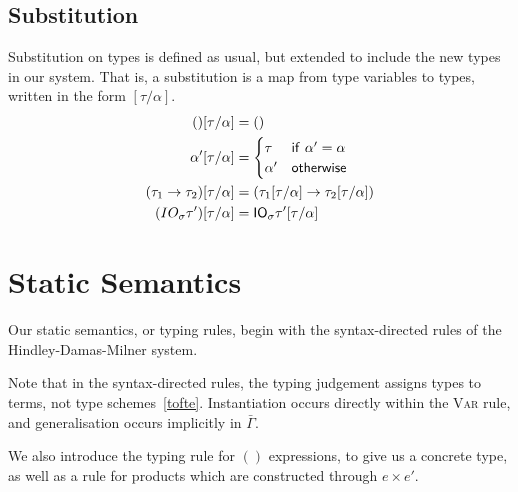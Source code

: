 \subsection{Substitution}
Substitution on types is defined as usual, but extended to include the
new types in our system. That is, a substitution is a map from type
variables to types, written in the form $[\tau/\alpha]$. 
\begin{align*}
  () [\tau/\alpha] &= () \\
  \alpha' [\tau/\alpha] &=
             \begin{cases}
               \tau & \mathsf{if} \ \alpha' = \alpha \\
               \alpha' & \mathsf{otherwise}
             \end{cases} \\
  (\tau_1 \rightarrow \tau_2)[\tau/\alpha] &= (\tau_1[\tau/\alpha] \rightarrow \tau_2[\tau/\alpha]) \\
  (IO_\sigma \tau')[\tau/\alpha] &= \mathsf{IO}_\sigma \tau'[\tau/\alpha]
\end{align*}

\section{Static Semantics}

Our static semantics, or typing rules, begin with the syntax-directed
rules of the Hindley-Damas-Milner system.

Note that in the syntax-directed rules, the typing judgement assigns
types to terms, not type schemes~\ref{tofte}. Instantiation occurs
directly within the \textsc{Var} rule, and generalisation occurs
implicitly in $\bar{\Gamma}$.
  
We also introduce the typing rule for $()$ expressions, to give us a
concrete type, as well as a rule for products which are constructed
through $e \times e'$.

